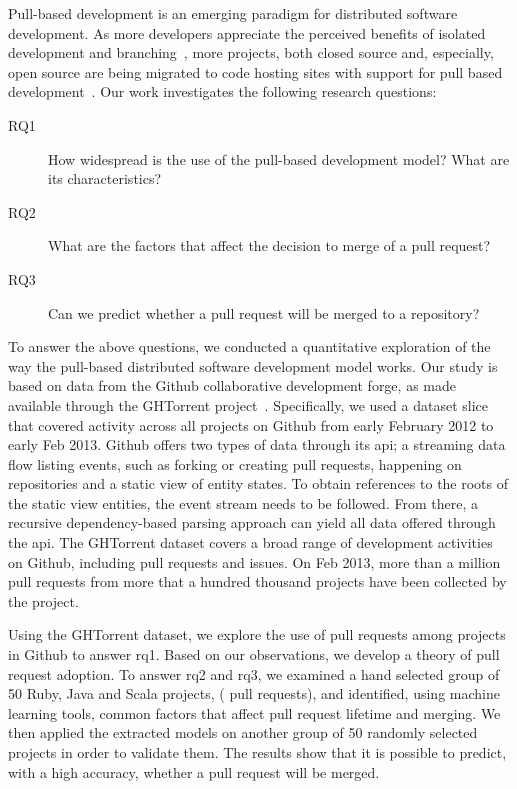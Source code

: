 \documentclass{sig-alternate}
\begin{document}
Pull-based development is an emerging paradigm for distributed software
development. As more developers appreciate the perceived benefits of isolated
development and branching~\cite{Bird12}, more projects, both closed source and,
especially, open source are being migrated to code hosting sites with support
for pull based development~\cite{Barr12}. Our work investigates the following
research questions:

\begin{description}
  
  \item[RQ1] How widespread is the use of the pull-based development model? What
    are its characteristics?
  
  \item[RQ2] What are the factors that affect the decision to merge of a pull request?

  \item[RQ3] Can we predict whether a pull request will be merged to a
    repository?

\end{description}

To answer the above questions, we conducted a quantitative exploration of the
way the pull-based distributed software development model works.
Our study is based on data from the Github
collaborative development forge, as made available through the GHTorrent
project~\cite{GS12}. Specifically, we used a dataset slice that covered activity
across all projects on Github from early February 2012 to early Feb 2013.
Github offers two types of data through its {\sc api}; a streaming data flow
listing events, such as forking or creating pull requests, happening on
repositories and a static view of entity states. To obtain references to the
roots of the static view entities, the event stream needs to be followed. From
there, a recursive dependency-based parsing approach can yield all data
offered through the {\sc api}. 
The GHTorrent dataset covers a broad range of development activities on Github,
including pull requests and issues. On Feb 2013, more than a million 
pull requests from more that a hundred thousand projects have been collected by the project.

Using the GHTorrent dataset, we explore the use of pull requests among projects
in Github to answer {\sc rq1}. Based on our observations, we develop a theory
of pull request adoption.
To answer {\sc rq2} and {\sc rq3}, we examined a hand selected group of 50 Ruby, Java and Scala projects,
( pull requests), and identified, using machine
learning tools, common factors that affect pull request lifetime and merging. We
then applied the extracted models on another group of 50 randomly selected
projects in order to validate them. The results show that it is
possible to predict, with a high accuracy, whether a pull request will be
merged.
\end{document}
